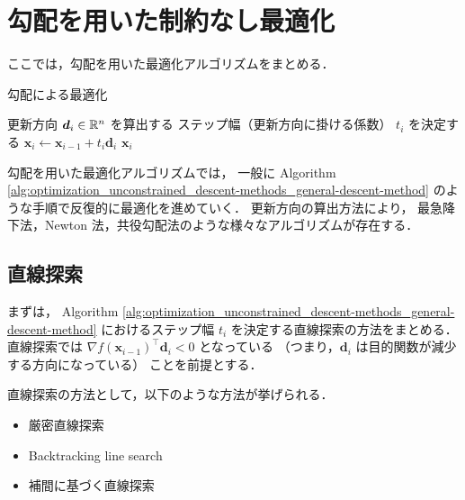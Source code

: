 %

\chapter{勾配を用いた制約なし最適化}
\label{chap:optimization_unconstrained_descent-methods}

ここでは，勾配を用いた最適化アルゴリズムをまとめる．

\begin{algorithm}[tp]
    \caption{勾配による最適化}
    \label{alg:optimization_unconstrained_descent-methods_general-descent-method}
    \begin{algorithmic}
        \State 更新方向 $\bm{d}_i \in \mathbb{R}^n$ を算出する
        \State ステップ幅（更新方向に掛ける係数） $t_i$ を決定する
        \State $\bm{x}_i \gets \bm{x}_{i-1} + t_i \bm{d}_i$
        \State \Return $\bm{x}_i$
        \EndIf
        \EndFor
        \EndProcedure
    \end{algorithmic}
\end{algorithm}

勾配を用いた最適化アルゴリズムでは，
一般に
Algorithm \ref{alg:optimization_unconstrained_descent-methods_general-descent-method}
のような手順で反復的に最適化を進めていく．
更新方向の算出方法により，
最急降下法，Newton 法，共役勾配法のような様々なアルゴリズムが存在する．

\section{直線探索}
\label{sec:optimization_unconstrained_descent-methods_line-search}

まずは，
Algorithm \ref{alg:optimization_unconstrained_descent-methods_general-descent-method}
におけるステップ幅 $t_i$ を決定する直線探索の方法をまとめる．
直線探索では
$\nabla f(\bm{x}_{i-1})^\top \bm{d}_i < 0$ となっている
（つまり，$\bm{d}_i$ は目的関数が減少する方向になっている）
ことを前提とする．

直線探索の方法として，以下のような方法が挙げられる．

\begin{itemize}
    \item 厳密直線探索
    \item Backtracking line search \cite[Section 9.2]{Boyd2004}
    \item 補間に基づく直線探索 \cite[Section 9.7.1]{Press2007}
\end{itemize}

